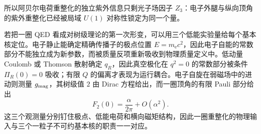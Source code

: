 所以阿贝尔电荷重整化的独立紫外信息只剩光子场因子 \(Z_3\)：电子外腿与纵向顶角的紫外重整化已经被局域 \(U(1)\) 对称性锁定为同一个量。

若把一圈 QED 看成对树级理论的第一次形变，可以用三个低能实验量给每个基本核定位。电子静止能确定精确传播子的极点位置 \(E=m_{\mathrm e} c^2\)，因此电子自能的常数部分不能独立成为新参数，而被质量反项重新吸收到物理质量定义中。低动量 Coulomb 或 Thomson 散射确定 \(q_R\)，因此真空极化在 \(q^2=0\) 的常数部分被条件 \(\Pi_R(0)=0\) 吸收；有限 \(Q\) 的偏离才表现为运行耦合。电子自旋在弱磁场中的进动则测量 \(g_{\rm mag}\)，其树级值 \(2\) 由 Dirac 方程给出，而一圈顶角的有限 Pauli 部分给出
\[
F_2(0)=\frac{\alpha}{2\pi}+O(\alpha^2).
\]
这三个观测量分别钉住极点、低能电荷和横向磁矩结构，因此一圈重整化的物理输入与三个一粒子不可约基本核的职责一一对应。

